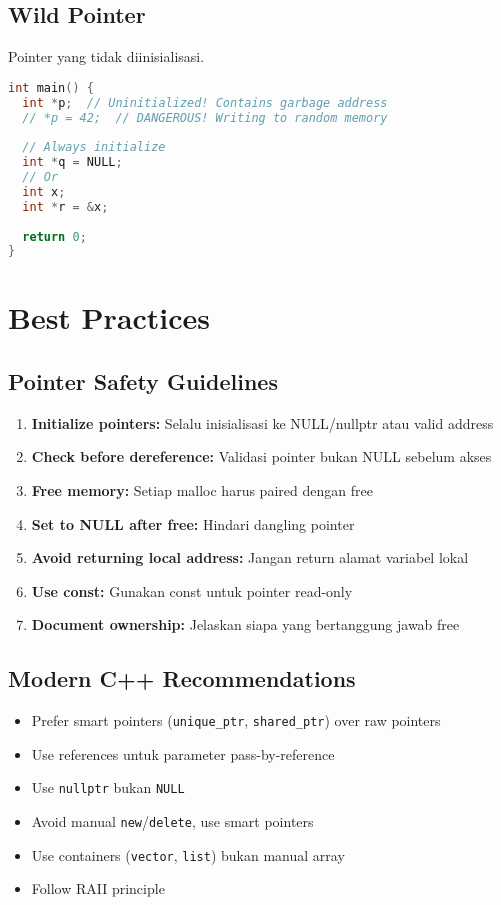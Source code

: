 \documentclass[../main.tex]{subfiles}
\begin{document}
\subsection{Wild Pointer}

Pointer yang tidak diinisialisasi.

\begin{lstlisting}[language=C, caption={Wild pointer}]
int main() {
  int *p;  // Uninitialized! Contains garbage address
  // *p = 42;  // DANGEROUS! Writing to random memory
  
  // Always initialize
  int *q = NULL;
  // Or
  int x;
  int *r = &x;
  
  return 0;
}
\end{lstlisting}

\section{Best Practices}

\subsection{Pointer Safety Guidelines}

\begin{enumerate}
  \item \textbf{Initialize pointers:} Selalu inisialisasi ke NULL/nullptr atau valid address
  \item \textbf{Check before dereference:} Validasi pointer bukan NULL sebelum akses
  \item \textbf{Free memory:} Setiap malloc harus paired dengan free
  \item \textbf{Set to NULL after free:} Hindari dangling pointer
  \item \textbf{Avoid returning local address:} Jangan return alamat variabel lokal
  \item \textbf{Use const:} Gunakan const untuk pointer read-only
  \item \textbf{Document ownership:} Jelaskan siapa yang bertanggung jawab free
\end{enumerate}

\subsection{Modern C++ Recommendations}

\begin{itemize}
  \item Prefer smart pointers (\texttt{unique\_ptr}, \texttt{shared\_ptr}) over raw pointers
  \item Use references untuk parameter pass-by-reference
  \item Use \texttt{nullptr} bukan \texttt{NULL}
  \item Avoid manual \texttt{new}/\texttt{delete}, use smart pointers
  \item Use containers (\texttt{vector}, \texttt{list}) bukan manual array
  \item Follow RAII principle
\end{itemize}
\end{document}
